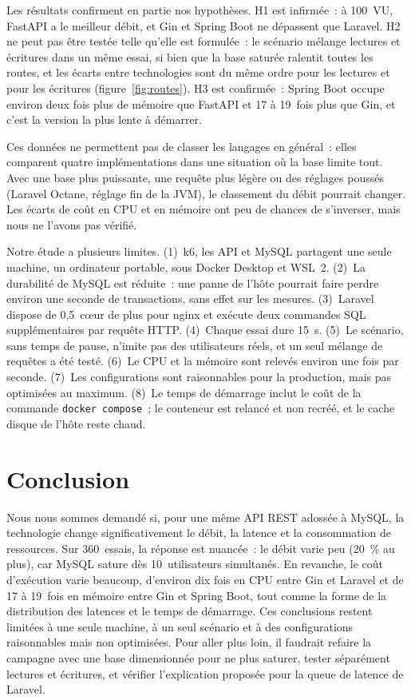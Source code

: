 \documentclass[conference,a4paper]{IEEEtran}
\begin{document}
Les résultats confirment en partie nos hypothèses. H1 est infirmée~:
à 100~VU, FastAPI a le meilleur débit, et Gin et Spring Boot ne
dépassent que Laravel. H2 ne peut pas être testée telle qu'elle est
formulée~: le scénario mélange lectures et écritures dans un même
essai, si bien que la base saturée ralentit toutes les routes, et les
écarts entre technologies sont du même ordre pour les lectures et pour
les écritures (figure~\ref{fig:routes}). H3 est confirmée~: Spring Boot
occupe environ deux fois plus de mémoire que FastAPI et 17 à 19~fois
plus que Gin, et c'est la version la plus lente à démarrer.

Ces données ne permettent pas de classer les langages en général~:
elles comparent quatre implémentations dans une situation où la base
limite tout. Avec une base plus puissante, une requête plus légère ou
des réglages poussés (Laravel Octane, réglage fin de la JVM), le
classement du débit pourrait changer. Les écarts de coût en CPU et en
mémoire ont peu de chances de s'inverser, mais nous ne l'avons pas
vérifié.

Notre étude a plusieurs limites. (1)~k6, les API et MySQL partagent
une seule machine, un ordinateur portable, sous Docker Desktop et
WSL~2. (2)~La durabilité de MySQL est réduite~: une panne de l'hôte
pourrait faire perdre environ une seconde de transactions, sans effet
sur les mesures. (3)~Laravel dispose de 0,5~cœur de plus pour nginx et
exécute deux commandes SQL supplémentaires par requête HTTP.
(4)~Chaque essai dure 15~s. (5)~Le scénario, sans temps de pause,
n'imite pas des utilisateurs réels, et un seul mélange de requêtes a
été testé. (6)~Le CPU et la mémoire sont relevés environ une fois par
seconde. (7)~Les configurations sont raisonnables pour la production,
mais pas optimisées au maximum. (8)~Le temps de démarrage inclut le
coût de la commande \texttt{docker compose}~; le conteneur est relancé
et non recréé, et le cache disque de l'hôte reste chaud.

\section{Conclusion}
Nous nous sommes demandé si, pour une même API REST adossée à MySQL, la
technologie change significativement le débit, la latence et la
consommation de ressources. Sur 360~essais, la réponse est nuancée~: le
débit varie peu (20~\% au plus), car MySQL sature dès 10~utilisateurs
simultanés. En revanche, le coût d'exécution varie beaucoup, d'environ
dix fois en CPU entre Gin et Laravel et de 17 à 19~fois en mémoire
entre Gin et Spring Boot, tout comme la forme de la distribution des
latences et le temps de démarrage. Ces conclusions restent limitées à
une seule machine, à un seul scénario et à des configurations
raisonnables mais non optimisées. Pour aller plus loin, il faudrait
refaire la campagne avec une base dimensionnée pour ne plus saturer,
tester séparément lectures et écritures, et vérifier l'explication
proposée pour la queue de latence de Laravel.
\end{document}
